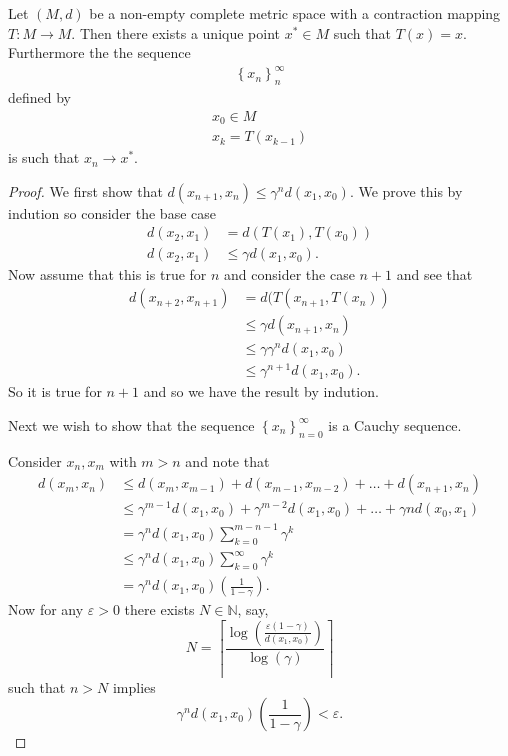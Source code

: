 \documentclass{unswmaths}
\begin{document}
\begin{unswthm}
	Let $ (M, d) $ be a non-empty complete metric space with a contraction mapping 
	$ T : M \longrightarrow M $. Then there exists a unique point $ x^* \in M $ such that
	$ T(x) = x $. Furthermore the the sequence 
	\begin{align}
		\label{eq:Banach_FPT_Seq}
		\left\{ x_n \right\}_n^\infty 
	\end{align} defined by 
	\begin{align}
		x_0 \in M \\
		x_k = T(x_{k-1}) 
	\end{align}
	is such that $ x_n \longrightarrow x^* $.
\end{unswthm}
\begin{proof}
	We first show that $ d(x_{n+1}, x_n) \leq \gamma^n d(x_1, x_0) $.
	We prove this by indution so consider the base case 
	\begin{align*}
		d(x_2, x_1) 	&= d(T(x_1), T(x_0)) \\
		d(x_2, x_1) 	&\leq \gamma d(x_1, x_0).
	\end{align*}
	Now assume that this is true for $ n $ and consider the case $ n+1 $ and see that
	\begin{align*}
		d(x_{n+2}, x_{n+1})	&= d(T(x_{n+1}, T(x_n)) \\
					&\leq \gamma d(x_{n+1}, x_n) \\
					&\leq \gamma \gamma^n d(x_1, x_0) \\
					&\leq \gamma^{n+1} d(x_1, x_0).
	\end{align*}
	So it is true for $ n + 1 $ and so we have the result by indution.
	
	Next we wish to show that the sequence $ \left\{ x_n \right\}_{n=0}^\infty $ is a Cauchy sequence.
	
	Consider $ x_n, x_m $ with $ m > n $ and note that
	\begin{align}
		d(x_m, x_n) 	&\leq d(x_m, x_{m-1}) + d(x_{m-1}, x_{m-2}) + \ldots + d(x_{n+1}, x_{n}) \nonumber \\
				&\leq \gamma^{m-1} d(x_1, x_0) + \gamma^{m-2} d(x_1, x_0) + \ldots + \gamma{n} d(x_0, x_1) \nonumber \\
				&= \gamma^n d(x_1, x_0) \sum_{k=0}^{m-n-1}\gamma^{k} \nonumber \\
				&\leq \gamma^{n}d(x_1, x_0) \sum_{k=0}^{\infty} \gamma^{k} \nonumber \\
				&= \gamma^n d(x_1, x_0) \left( \frac{1}{1-\gamma} \right).
	\end{align}
	Now for any $ \varepsilon > 0 $ there exists $ N \in \mathbb{N} $, say,
	$$ N = \left\lceil \frac{\log \left(\frac{\varepsilon(1 - \gamma)}{d(x_1, x_0)}\right)}{\log(\gamma)} \right\rceil $$ 
	such that $ n > N $ implies 
	$$ \gamma^n d(x_1, x_0) \left( \frac{1}{1-\gamma} \right) < \varepsilon. $$
	

\end{proof}
\end{document}
